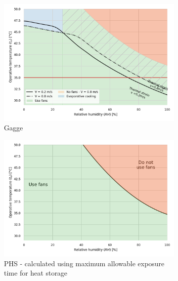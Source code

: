 \begin{figure}%
    \centering
    \begin{subfigure}[t]{0.49\textwidth}
        \centering
        \includegraphics[width=1\linewidth]{figures/gagge}
        \caption{
            Gagge
        }
        \label{fig:gagge}
    \end{subfigure}
    \hfill
    \begin{subfigure}[t]{0.49\textwidth}
        \centering
        \includegraphics[width=1\linewidth]{figures/phs_results}
        \caption{
            PHS - calculated using maximum allowable exposure time for heat storage
        }
        \label{fig:phs}
    \end{subfigure}
    \hfill
        \centering
    \begin{subfigure}[t]{.75\textwidth}
        \centering

\end{subfigure}
\end{figure}
